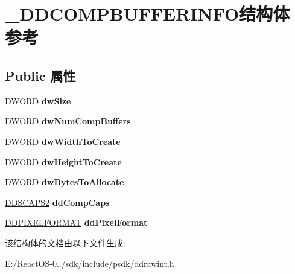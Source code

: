 \hypertarget{struct___d_d_c_o_m_p_b_u_f_f_e_r_i_n_f_o}{}\section{\+\_\+\+D\+D\+C\+O\+M\+P\+B\+U\+F\+F\+E\+R\+I\+N\+F\+O结构体 参考}
\label{struct___d_d_c_o_m_p_b_u_f_f_e_r_i_n_f_o}
\subsection*{Public 属性}
\begin{DoxyCompactItemize}
\item 
\mbox{\label{struct___d_d_c_o_m_p_b_u_f_f_e_r_i_n_f_o_a95c6318ba7729d3b870108ab5cb23d37}} 
D\+W\+O\+RD {\bfseries dw\+Size}
\item 
\mbox{\label{struct___d_d_c_o_m_p_b_u_f_f_e_r_i_n_f_o_a154c0d5e3e784e8bf4bb4a82eacdbc92}} 
D\+W\+O\+RD {\bfseries dw\+Num\+Comp\+Buffers}
\item 
\mbox{\label{struct___d_d_c_o_m_p_b_u_f_f_e_r_i_n_f_o_ae71d42656e5c104245cbed4be7fc23b3}} 
D\+W\+O\+RD {\bfseries dw\+Width\+To\+Create}
\item 
\mbox{\label{struct___d_d_c_o_m_p_b_u_f_f_e_r_i_n_f_o_a635b2ef560fc765c0364470e833ac61c}} 
D\+W\+O\+RD {\bfseries dw\+Height\+To\+Create}
\item 
\mbox{\label{struct___d_d_c_o_m_p_b_u_f_f_e_r_i_n_f_o_a0b69ec9e68e6d6a390384bd2d1d7a69c}} 
D\+W\+O\+RD {\bfseries dw\+Bytes\+To\+Allocate}
\item 
\mbox{\label{struct___d_d_c_o_m_p_b_u_f_f_e_r_i_n_f_o_aeda8daf9884026567e9acd4a075b3949}} 
\hyperlink{struct___d_d_s_c_a_p_s2}{D\+D\+S\+C\+A\+P\+S2} {\bfseries dd\+Comp\+Caps}
\item 
\mbox{\label{struct___d_d_c_o_m_p_b_u_f_f_e_r_i_n_f_o_a2e83865dedc10ecf43cfb81b7c4f5be6}} 
\hyperlink{struct___d_d_p_i_x_e_l_f_o_r_m_a_t}{D\+D\+P\+I\+X\+E\+L\+F\+O\+R\+M\+AT} {\bfseries dd\+Pixel\+Format}
\end{DoxyCompactItemize}


该结构体的文档由以下文件生成\+:\begin{DoxyCompactItemize}
\item 
E\+:/\+React\+O\+S-\/0../sdk/include/psdk/ddrawint.\+h\end{DoxyCompactItemize}
